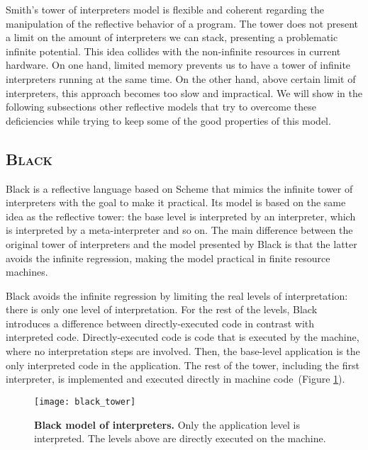 Smith's tower of interpreters model is flexible and coherent regarding the manipulation of the reflective behavior of a program. The tower does not present a limit on the amount of interpreters we can stack, presenting a problematic infinite potential. This idea collides with the non-infinite resources in current hardware. On one hand, limited memory prevents us to have a tower of infinite interpreters running at the same time. On the other hand, above certain limit of interpreters, this approach becomes too slow and impractical. We will show in the following subsections other reflective models that try to overcome these deficiencies while trying to keep some of the good properties of this model.

\subsection*{\textsc{Black}}

Black is a reflective language based on Scheme that mimics the infinite tower of interpreters with the goal to make it practical. Its model is based on the same idea as the reflective tower: the base level is interpreted by an interpreter, which is interpreted by a meta-interpreter and so on. The main difference between the original tower of interpreters and the model presented by Black is that the latter avoids the infinite regression, making the model practical in finite resource machines.

Black avoids the infinite regression by limiting the real levels of interpretation: there is only one level of interpretation. For the rest of the levels, Black  introduces a difference between directly-executed code in contrast with interpreted code. Directly-executed code is code that is executed by the machine, where no interpretation steps are involved. Then, the base-level application is the only interpreted code in the application. The rest of the tower, including the first interpreter, is implemented and executed directly in machine code~(Figure \ref{fig:black_tower}).

\begin{figure}[ht]
\begin{center}
\texttt{[image: black\_tower]}
\caption{\textbf{Black model of interpreters.} Only the application level is interpreted. The levels above are directly executed on the machine.\label{fig:black_tower}
 }
\end{center}
\end{figure}

